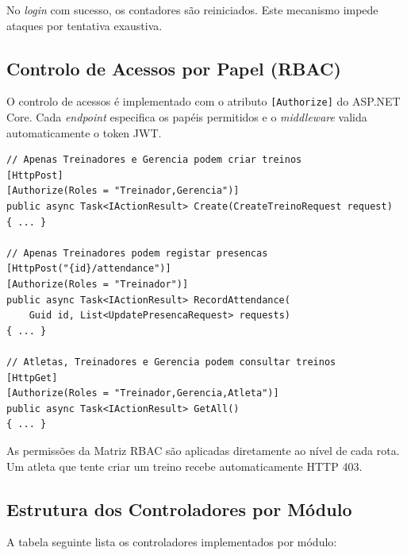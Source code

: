 No \textit{login} com sucesso, os contadores são reiniciados. Este mecanismo impede ataques por tentativa exaustiva.

\subsection{Controlo de Acessos por Papel (RBAC)}

O controlo de acessos é implementado com o atributo \texttt{[Authorize]} do ASP.NET Core. Cada \textit{endpoint} especifica os papéis permitidos e o \textit{middleware} valida automaticamente o token JWT.

\begin{lstlisting}[language={[Sharp]C},basicstyle=\ttfamily\small,breaklines=true,frame=single,caption={Exemplos de controlo de acessos RBAC nos \textit{Controllers}.},label={lst:rbac}]
// Apenas Treinadores e Gerencia podem criar treinos
[HttpPost]
[Authorize(Roles = "Treinador,Gerencia")]
public async Task<IActionResult> Create(CreateTreinoRequest request)
{ ... }

// Apenas Treinadores podem registar presencas
[HttpPost("{id}/attendance")]
[Authorize(Roles = "Treinador")]
public async Task<IActionResult> RecordAttendance(
    Guid id, List<UpdatePresencaRequest> requests)
{ ... }

// Atletas, Treinadores e Gerencia podem consultar treinos
[HttpGet]
[Authorize(Roles = "Treinador,Gerencia,Atleta")]
public async Task<IActionResult> GetAll()
{ ... }
\end{lstlisting}

As permissões da Matriz RBAC são aplicadas diretamente ao nível de cada rota. Um atleta que tente criar um treino recebe automaticamente HTTP 403.

\subsection{Estrutura dos Controladores por Módulo}

A tabela seguinte lista os controladores implementados por módulo:

